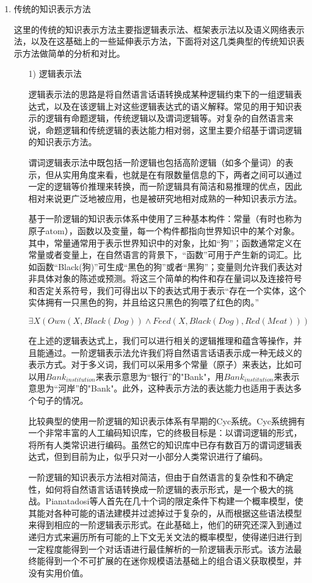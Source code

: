 \begin{enumerate}
\item {传统的知识表示方法}

这里的传统的知识表示方法主要指逻辑表示法、框架表示法以及语义网络表示法，以及在这基础上的一些延伸表示方法，下面将对这几类典型的传统知识表示方法做简单的分析和对比。

\begin{enumerate}
\item[1)] 逻辑表示法

逻辑表示法的思路是将自然语言话语转换成某种逻辑约束下的一组逻辑表达式，以及在该逻辑上对这些逻辑表达式的语义解释。常见的用于知识表示的逻辑有命题逻辑，传统逻辑以及谓词逻辑等。对复杂的自然语言来说，命题逻辑和传统逻辑的表达能力相对弱，这里主要介绍基于谓词逻辑的知识表示方法。

谓词逻辑表示法中既包括一阶逻辑也包括高阶逻辑（如多个量词）的表示，但从实用角度来看，也就是在有限数量信息的下，两者之间可以通过一定的逻辑等价推理来转换，而一阶逻辑具有简洁和易推理的优点，因此相对来说更广泛地被应用，也是被研究地相对成熟的一种知识表示方法。

基于一阶逻辑的知识表示体系中使用了三种基本构件：常量（有时也称为原子atom），函数以及变量，每一个构件都指向世界知识中的某个对象。其中，常量通常用于表示世界知识中的对象，比如“狗”；函数通常定义在常量或者变量上，在自然语言的背景下，“函数”可用于产生新的词汇。比如函数“Black(狗)”可生成“黑色的狗”或者“黑狗”；变量则允许我们表达对非具体对象的陈述或预测。将这三个简单的构件和存在量词以及连接符号和否定关系符号，我们可得出以下的表达式用于表示“存在一个实体，这个实体拥有一只黑色的狗，并且给这只黑色的狗喂了红色的肉。”

$$ 
\exists X(Own(X, Black(Dog))\land Feed(X, Black(Dog), Red(Meat))) 
$$


在上述的逻辑表达式上，我们可以进行相关的逻辑推理和蕴含等操作，并且能通过。一阶逻辑表示法允许我们将自然语言话语表示成一种无歧义的表示方式。对于多义词，我们可以采用多个常量（原子）来表达，比如可以用$Bank_{institution}$来表示意思为“银行”的"Bank"，用$Bank_{institution}$来表示意思为“河岸”的"Bank"。此外，这种表示方法的表达能力也适用于表达多个句子的情况。

比较典型的使用一阶逻辑的知识表示体系有早期的Cyc系统\cite{Lenat1990}。Cyc系统拥有一个非常丰富的人工编码知识库，它的终极目标是：以谓词逻辑的形式，将所有人类常识进行编码。虽然它的知识库中已存有数百万的谓词逻辑表达式，但到目前为止，似乎只对一小部分人类常识进行了编码。

一阶逻辑的知识表示方法相对简洁，但由于自然语言的复杂性和不确定性，如何将自然语言话语转换成一阶逻辑的表示形式，是一个极大的挑战。Pianatadosi等人\cite{Piantadosi2008}首先在几十个词的限定条件下构建一个概率模型，使其能对各种可能的语法建模并过滤掉过于复杂的，从而根据这些语法模型来得到相应的一阶逻辑表示形式。在此基础上，他们的研究还深入到通过递归方式来遍历所有可能的上下文无关文法的概率模型，使得递归进行到一定程度能得到一个对话语进行最佳解析的一阶逻辑表示形式。该方法最终能得到一个不可扩展的在迷你规模语法基础上的组合语义获取模型，并没有实用价值。


\end{enumerate}
\end{enumerate}

